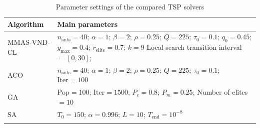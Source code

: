 \documentclass[pdflatex,sn-basic,Numbered]{sn-jnl}
\begin{document}
\begin{table}[!t]
\caption{Parameter settings of the compared TSP solvers}
\label{tab:tsp_params}
\centering
\scriptsize
\begin{tabular}{>{\centering\arraybackslash}m{} m{}}
\toprule
Algorithm & Main parameters \\
\midrule
MMAS-VND-CL & $n_{\mathrm{ants}}=40$;
$\alpha=1$;
$\beta=2$;\newline
$\rho=0.25$;
$Q=225$;
$\tau_0=0.1$;\newline
$q_0=0.45$;
$y_{\max}=0.4$;\newline
$r_{\mathrm{elite}}=0.7$;
$k=9$ \newline
Local search transition interval$=[0,30]$;\\
\midrule
ACO & $n_{\mathrm{ants}}=40$;
$\alpha=1$;
$\beta=2$;
$\rho=0.25$;\newline
$Q=225$;
$\tau_0=0.1$;
$\mathrm{Iter}=100$ \\
\midrule
GA & $\mathrm{Pop}=100$;
$\mathrm{Iter}=1500$;\newline
$P_c=0.8$;
$P_m=0.25$;\newline
Number of elites$=10$ \\
\midrule
SA & $T_0=150$;
$\alpha=0.996$;\newline
$L=10$;
$T_{\mathrm{end}}=10^{-8}$ \\
\botrule
\end{tabular}
\end{table}
\end{document}
